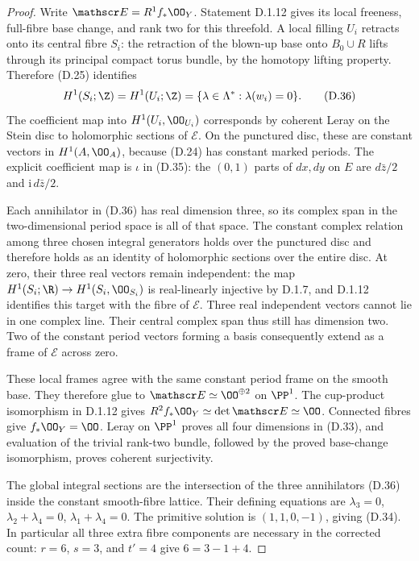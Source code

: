 \begin{proof}
Write $\mathscr E=R^1f_*\OO_Y$. Statement D.1.12 gives its
local freeness, full-fibre base change, and rank two for this
threefold. A local filling $U_i$ retracts onto its central
fibre $S_i$: the retraction of the blown-up base onto
$B_0\cup R$ lifts through its principal compact torus
bundle, by the homotopy lifting property. Therefore (D.25)
identifies
\[
 H^1(S_i;\Z)=H^1(U_i;\Z)
          =\{\lambda\in\Lambda^*:\lambda(w_i)=0\}.
\tag{D.36}
\]
The coefficient map into $H^1(U_i,\OO_{U_i})$
corresponds by coherent Leray on the Stein disc to
holomorphic sections of $\mathscr E$. On the punctured
disc, these are constant vectors in $H^1(A,\OO_A)$,
because (D.24) has constant marked periods. The explicit
coefficient map is $\iota$ in (D.35): the $(0,1)$ parts
of $dx,dy$ on $E$ are $d\bar z/2$ and
$\mathrm i\,d\bar z/2$.

Each annihilator in (D.36) has real dimension three, so
its complex span in the two-dimensional period space is
all of that space. The constant complex relation among
three chosen integral generators holds over the
punctured disc and therefore holds as an identity of
holomorphic sections over the entire disc. At zero,
their three real vectors remain independent: the map
$H^1(S_i;\R)\to H^1(S_i,\OO_{S_i})$ is real-linearly
injective by D.1.7, and D.1.12 identifies this target
with the fibre of $\mathscr E$. Three real independent
vectors cannot lie in one complex line. Their central
complex span thus still has dimension two. Two of the
constant period vectors forming a basis consequently
extend as a frame of $\mathscr E$ across zero.

These local frames agree with the same constant period
frame on the smooth base. They therefore glue to
$\mathscr E\simeq\OO^{\oplus2}$ on $\PP^1$.
The cup-product isomorphism in D.1.12 gives
$R^2f_*\OO_Y\simeq\det\mathscr E\simeq\OO$.
Connected fibres give $f_*\OO_Y=\OO$. Leray on $\PP^1$
proves all four dimensions in (D.33), and evaluation
of the trivial rank-two bundle, followed by the proved
base-change isomorphism, proves coherent surjectivity.

The global integral sections are the intersection of
the three annihilators (D.36) inside the constant
smooth-fibre lattice. Their defining equations are
$\lambda_3=0$, $\lambda_2+\lambda_4=0$,
$\lambda_1+\lambda_4=0$. The primitive solution is
$(1,1,0,-1)$, giving (D.34). In particular all three
extra fibre components are necessary in the corrected
count: $r=6$, $s=3$, and $t'=4$ give
$6=3-1+4$.


\end{proof}
